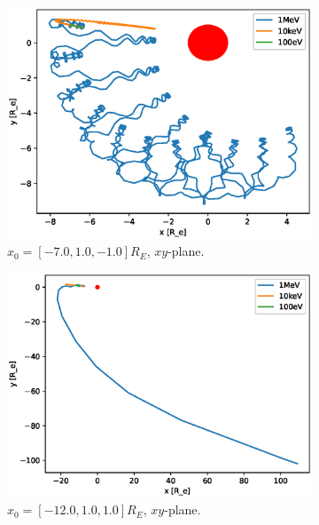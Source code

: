 \begin{figure}
\begin{subfigure}[h]{0.45\textwidth}
        \includegraphics[width=\textwidth]{Figures/Trajectories/trajectories-xy-71.eps}
        \caption{$x_0 = [-7.0,1.0,-1.0]R_E$, $xy$-plane.}
        \label{fig:traj-c}
    \end{subfigure}
    \hfill
    \begin{subfigure}[h]{0.45\textwidth}
        \includegraphics[width=\textwidth]{Figures/Trajectories/trajectories-xy-98.eps}
        \caption{$x_0 = [-12.0,1.0,1.0]R_E$, $xy$-plane.}
        \label{fig:traj-d}
    \end{subfigure}
    \vfill
    \begin{subfigure}[h]{0.45\textwidth}

\end{subfigure}
\end{figure}
